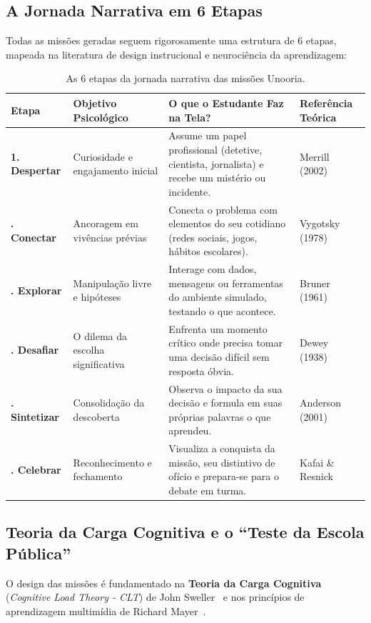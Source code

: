 \documentclass[11pt,a4paper]{article}
\begin{document}
\subsection{A Jornada Narrativa em 6 Etapas}
Todas as missões geradas seguem rigorosamente uma estrutura de 6 etapas, mapeada na literatura de design instrucional e neurociência da aprendizagem:

\begin{table}[htbp]
  \centering
  \small
  \begin{tabularx}{\textwidth}{>{\bfseries}l>{\raggedright\arraybackslash}p{3.2cm}X>{\raggedright\arraybackslash}p{3.4cm}}
    \toprule
    Etapa & Objetivo Psicológico & O que o Estudante Faz na Tela? & Referência Teórica \\
    \midrule
    1. Despertar & Curiosidade e engajamento inicial & Assume um papel profissional (detetive, cientista, jornalista) e recebe um mistério ou incidente. & Merrill (2002)~\cite{merrill2002first} \\
    \addlinespace
    2. Conectar & Ancoragem em vivências prévias & Conecta o problema com elementos do seu cotidiano (redes sociais, jogos, hábitos escolares). & Vygotsky (1978)~\cite{vygotsky1978mind} \\
    \addlinespace
    3. Explorar & Manipulação livre e hipóteses & Interage com dados, mensagens ou ferramentas do ambiente simulado, testando o que acontece. & Bruner (1961)~\cite{bruner1961discovery} \\
    \addlinespace
    4. Desafiar & O dilema da escolha significativa & Enfrenta um momento crítico onde precisa tomar uma decisão difícil sem resposta óbvia. & Dewey (1938)~\cite{dewey1938experience} \\
    \addlinespace
    5. Sintetizar & Consolidação da descoberta & Observa o impacto da sua decisão e formula em suas próprias palavras o que aprendeu. & Anderson (2001)~\cite{anderson2001taxonomy} \\
    \addlinespace
    6. Celebrar & Reconhecimento e fechamento & Visualiza a conquista da missão, seu distintivo de ofício e prepara-se para o debate em turma. & Kafai \& Resnick~\cite{kafai1996constructionism} \\
    \bottomrule
  \end{tabularx}
  \caption{As 6 etapas da jornada narrativa das missões Unooria.}
  \label{tab:6_etapas}
\end{table}

\subsection{Teoria da Carga Cognitiva e o ``Teste da Escola Pública''}
O design das missões é fundamentado na \textbf{Teoria da Carga Cognitiva} (\textit{Cognitive Load Theory - CLT}) de John Sweller~\cite{sweller1988cognitive, sweller2011cognitive} e nos princípios de aprendizagem multimídia de Richard Mayer~\cite{mayer2002multimedia}.
\end{document}
